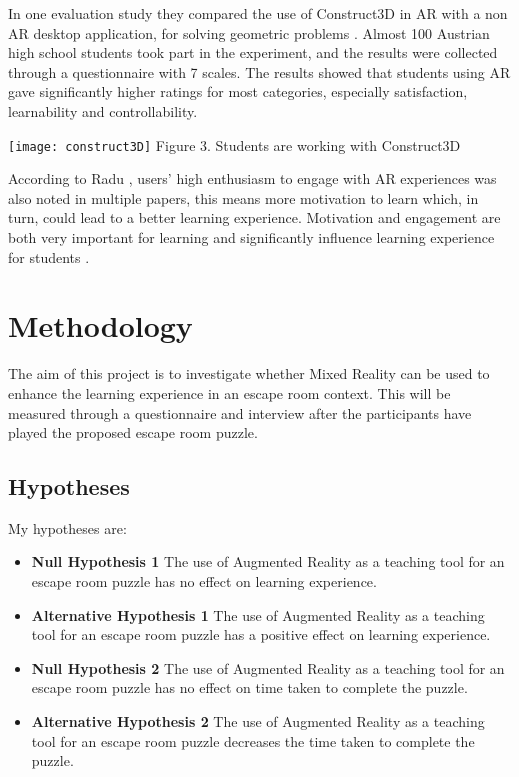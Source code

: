 \documentclass[journal]{IEEEtran}
\begin{document}
In one evaluation study they compared the use of Construct3D in AR with a non AR desktop application, for solving geometric problems \cite{shumaker_summary_2007}. Almost 100 Austrian high school students took part in the experiment, and the results were collected through a questionnaire with 7 scales. The results showed that students using AR gave significantly higher ratings for most categories, especially satisfaction, learnability and controllability.  

\texttt{[image: construct3D]}
Figure 3. Students are working with Construct3D  \cite{marz_dissertation_nodate}
\newline

According to Radu \cite{radu_why_2012}, users' high enthusiasm to engage with AR experiences was also noted in multiple papers, this means more motivation to learn which, in turn, could lead to a better learning experience. Motivation and engagement are both very important for learning and significantly influence learning experience for students \cite{newmann_student_1992, maulana_teacherstudent_2011}. 


\section{Methodology} \label{Methodology}
The aim of this project is to investigate whether Mixed Reality can be used to enhance the learning experience in an escape room context. This will be measured through a questionnaire and interview after the participants have played the proposed escape room puzzle.

\subsection{Hypotheses} \label{Hypotheses}
My hypotheses are:
\begin{itemize}
	\item \textbf{Null Hypothesis 1} The use of Augmented Reality as a teaching tool for an escape room puzzle has no effect on learning experience.
	\item \textbf{Alternative Hypothesis 1} The use of Augmented Reality as a teaching tool for an escape room puzzle has a positive effect on learning experience.
	\item \textbf{Null Hypothesis 2} The use of Augmented Reality as a teaching tool for an escape room puzzle has no effect on time taken to complete the puzzle.
	\item \textbf{Alternative Hypothesis 2} The use of Augmented Reality as a teaching tool for an escape room puzzle decreases the time taken to complete the puzzle.
\end{itemize}
\end{document}

